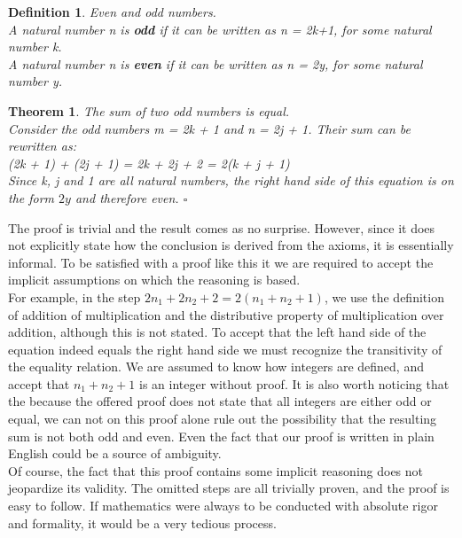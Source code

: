 \documentclass[11pt,a4paper]{article}
\begin{document}
\newtheorem{odd and even}{Definition}
\begin{odd and even}
Even and odd numbers.\\
A natural number n is \textbf{odd} if it can be written as n = 2k+1, for some natural number k.\\
A natural number n is \textbf{even} if it can be written as n = 2y, for some natural number y.\\
\end{odd and even}
\newtheorem{informal}{Theorem}
\begin{informal}
The sum of two odd numbers is equal.\\
Consider the odd numbers m = 2k + 1 and n = 2j + 1. Their sum can be rewritten as:\\
(2k + 1) + (2j + 1) = 2k + 2j + 2 = 2(k + j + 1)\\
Since k, j and 1 are all natural numbers, the right hand side of this equation is on the form $2y$ and therefore even. $\square$
\end{informal}

The proof is trivial and the result comes as no surprise. However, since it does not explicitly state how the conclusion is derived from the axioms, it is essentially informal. To be satisfied with a proof like this it we are required to accept the implicit assumptions on which the reasoning is based.\\
For example, in the step $2n_1+2n_2+2 = 2(n_1+n_2+1)$, we use the definition of addition of multiplication and the distributive property of multiplication over addition, although this is not stated. To accept that the left hand side of the equation indeed equals the right hand side we must recognize the transitivity of the equality relation. We are assumed to know how integers are defined, and accept that $n_1+n_2+1$ is an integer without proof. It is also worth noticing that the because the offered proof does not state that all integers are either odd or equal, we can not on this proof alone rule out the possibility that the resulting sum is not both odd and even. Even the fact that our proof is written in plain English could be a source of ambiguity.\\

Of course, the fact that this proof contains some implicit reasoning does not jeopardize its validity. The omitted steps are all trivially proven, and the proof is easy to follow. If mathematics were always to be conducted with absolute rigor and formality, it would be a very tedious process.\\
\end{document}
